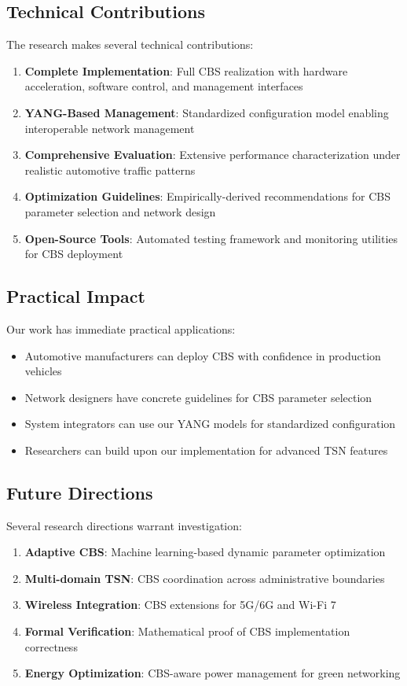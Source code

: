 \documentclass[10pt, journal, compsoc]{IEEEtran}
\begin{document}
\subsection{Technical Contributions}

The research makes several technical contributions:

\begin{enumerate}
    \item \textbf{Complete Implementation}: Full CBS realization with hardware acceleration, software control, and management interfaces
    \item \textbf{YANG-Based Management}: Standardized configuration model enabling interoperable network management
    \item \textbf{Comprehensive Evaluation}: Extensive performance characterization under realistic automotive traffic patterns
    \item \textbf{Optimization Guidelines}: Empirically-derived recommendations for CBS parameter selection and network design
    \item \textbf{Open-Source Tools}: Automated testing framework and monitoring utilities for CBS deployment
\end{enumerate}

\subsection{Practical Impact}

Our work has immediate practical applications:
\begin{itemize}
    \item Automotive manufacturers can deploy CBS with confidence in production vehicles
    \item Network designers have concrete guidelines for CBS parameter selection
    \item System integrators can use our YANG models for standardized configuration
    \item Researchers can build upon our implementation for advanced TSN features
\end{itemize}

\subsection{Future Directions}

Several research directions warrant investigation:

\begin{enumerate}
    \item \textbf{Adaptive CBS}: Machine learning-based dynamic parameter optimization
    \item \textbf{Multi-domain TSN}: CBS coordination across administrative boundaries
    \item \textbf{Wireless Integration}: CBS extensions for 5G/6G and Wi-Fi 7
    \item \textbf{Formal Verification}: Mathematical proof of CBS implementation correctness
    \item \textbf{Energy Optimization}: CBS-aware power management for green networking
\end{enumerate}
\end{document}
